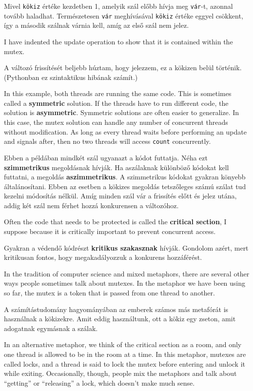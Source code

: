 \documentclass{book}
\begin{document}
Mivel {\tt kökiz} értéke kezdetben 1, amelyik szál előbb
hívja meg {\tt vár}-t, azonnal tovább haladhat. Természetesen
{\tt vár} meghívásával {\tt kökiz} értéke eggyel csökkent,
így a második szálnak várnia kell, amíg az első szál nem jelez.

I have indented the update operation to show that it is contained
within the mutex.

A változó frissítését beljebb húztam, hogy jelezzem, ez
a kökizen belül történik. (Pythonban ez szintaktikus hibának számít.)

In this example, both threads are running the same code.  This is
sometimes called a {\bf symmetric} solution.  If the threads have to
run different code, the solution is {\bf asymmetric}.  Symmetric
solutions are often easier to generalize.  In this case, the mutex
solution can handle any number of concurrent threads without
modification.  As long as every thread waits before 
performing an update and signals after, then no two threads
will access {\tt count} concurrently.

Ebben a példában mindkét szál ugyanazt a kódot futtatja. Néha ezt
{\bf szimmetrikus} megoldásnak hívják. Ha aszálaknak különböző
kódokat kell futtatni, a megoldás {\bf aszimmetrikus}. A szimmetrikus
kódokat gyakran könyebb általánosítani. Ebben az esetben a kökizes
megoldás tetszőleges számú szálat tud kezelni módosítás nélkül.
Amíg minden szál vár a frissítés előtt és jelez utána, addig két
szál nem férhet hozzá konkurensen a változóhoz.

Often the code that needs to be protected is called the
{\bf critical section}, I suppose because it is critically
important to prevent concurrent access.

Gyakran a védendő kódrészt {\bf kritikus szakasznak} hívják.
Gondolom azért, mert kritikusan fontos, hogy megakadályozzuk
a konkurens hozzáférést.

In the tradition of computer science and mixed metaphors, there
are several other ways people sometimes talk about mutexes.  In
the metaphor we have been using so far, the mutex is a token
that is passed from one thread to another.

A számítástudomány hagyományában az emberek számos más
metafórát is használnak a kökizekre. Amit eddig használtunk, ott
a kökiz egy zseton, amit adogatnak egymásnak a szálak.

In an alternative
metaphor, we think of the critical section as a room, and
only one thread is allowed to be in the room at a time.
In this metaphor, mutexes are called locks, and a thread
is said to lock the mutex before entering and unlock it while
exiting.  Occasionally, though, people mix the metaphors and
talk about ``getting'' or ``releasing'' a lock, which doesn't
make much sense.
\end{document}
